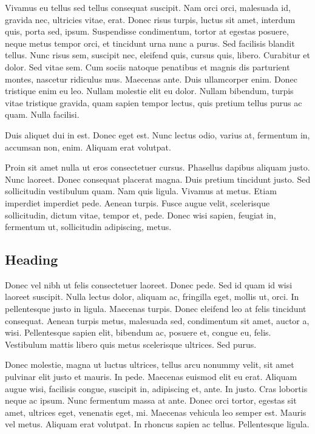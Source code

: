 Vivamus eu tellus sed tellus consequat suscipit. Nam orci orci, malesuada id, gravida nec,
ultricies vitae, erat. Donec risus turpis, luctus sit amet, interdum quis, porta sed, ipsum.
Suspendisse condimentum, tortor at egestas posuere, neque metus tempor orci, et tincidunt
urna nunc a purus. Sed facilisis blandit tellus. Nunc risus sem, suscipit nec, eleifend quis,
cursus quis, libero. Curabitur et dolor. Sed vitae sem. Cum sociis natoque penatibus et
magnis dis parturient montes, nascetur ridiculus mus. Maecenas ante. Duis ullamcorper
enim. Donec tristique enim eu leo. Nullam molestie elit eu dolor. Nullam bibendum, turpis
vitae tristique gravida, quam sapien tempor lectus, quis pretium tellus purus ac quam. Nulla
facilisi.

Duis aliquet dui in est. Donec eget est. Nunc lectus odio, varius at, fermentum in, accumsan
non, enim. Aliquam erat volutpat.

Proin sit amet nulla ut eros consectetuer cursus.
Phasellus dapibus aliquam justo. Nunc laoreet. Donec consequat placerat magna. Duis
pretium tincidunt justo. Sed sollicitudin vestibulum quam. Nam quis ligula. Vivamus at
metus. Etiam imperdiet imperdiet pede. Aenean turpis. Fusce augue velit, scelerisque
sollicitudin, dictum vitae, tempor et, pede. Donec wisi sapien, feugiat in, fermentum ut,
sollicitudin adipiscing, metus.

\subsection{Heading}
Donec vel nibh ut felis consectetuer laoreet. Donec pede. Sed id quam id wisi laoreet suscipit.
Nulla lectus dolor, aliquam ac, fringilla eget, mollis ut, orci. In pellentesque justo in ligula.
Maecenas turpis. Donec eleifend leo at felis tincidunt consequat. Aenean turpis metus,
malesuada sed, condimentum sit amet, auctor a, wisi. Pellentesque sapien elit, bibendum
ac, posuere et, congue eu, felis. Vestibulum mattis libero quis metus scelerisque ultrices.
Sed purus.

Donec molestie, magna ut luctus ultrices, tellus arcu nonummy velit, sit amet pulvinar elit
justo et mauris. In pede. Maecenas euismod elit eu erat. Aliquam augue wisi, facilisis
congue, suscipit in, adipiscing et, ante. In justo. Cras lobortis neque ac ipsum. Nunc
fermentum massa at ante. Donec orci tortor, egestas sit amet, ultrices eget, venenatis eget,
mi. Maecenas vehicula leo semper est. Mauris vel metus. Aliquam erat volutpat. In rhoncus
sapien ac tellus. Pellentesque ligula.

